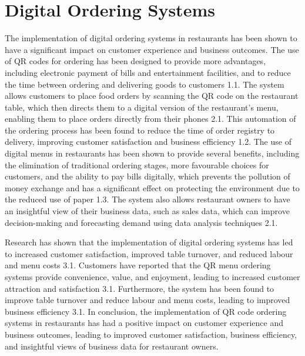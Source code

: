 \section{Digital Ordering Systems}
The implementation of digital ordering systems in restaurants has been shown to have a significant impact on customer experience and business outcomes. The use of QR codes for ordering has been designed to provide more advantages, including electronic payment of bills and entertainment facilities, and to reduce the time between ordering and delivering goods to customers 1.1. The system allows customers to place food orders by scanning the QR code on the restaurant table, which then directs them to a digital version of the restaurant's menu, enabling them to place orders directly from their phones 2.1. This automation of the ordering process has been found to reduce the time of order registry to delivery, improving customer satisfaction and business efficiency 1.2.
The use of digital menus in restaurants has been shown to provide several benefits, including the elimination of traditional ordering stages, more favourable choices for customers, and the ability to pay bills digitally, which prevents the pollution of money exchange and has a significant effect on protecting the environment due to the reduced use of paper 1.3. The system also allows restaurant owners to have an insightful view of their business data, such as sales data, which can improve decision-making and forecasting demand using data analysis techniques 2.1.

Research has shown that the implementation of digital ordering systems has led to increased customer satisfaction, improved table turnover, and reduced labour and menu costs 3.1. Customers have reported that the QR menu ordering systems provide convenience, value, and enjoyment, leading to increased customer attraction and satisfaction 3.1. Furthermore, the system has been found to improve table turnover and reduce labour and menu costs, leading to improved business efficiency 3.1.
In conclusion, the implementation of QR code ordering systems in restaurants has had a positive impact on customer experience and business outcomes, leading to improved customer satisfaction, business efficiency, and insightful views of business data for restaurant owners.

